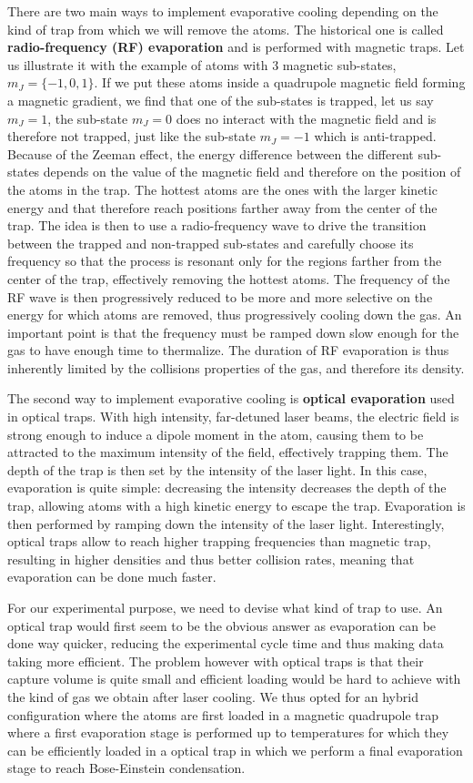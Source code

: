 There are two main ways to implement evaporative cooling depending on the kind of trap from which we will remove the atoms. The historical one is called \textbf{radio-frequency (RF) evaporation} and is performed with magnetic traps. Let us illustrate it with the example of atoms with 3 magnetic sub-states, $m_J=\{-1,0,1\}$. If we put these atoms inside a quadrupole magnetic field forming a magnetic gradient, we find that one of the sub-states is trapped, let us say $m_J=1$, the sub-state $m_J=0$ does no interact with the magnetic field and is therefore not trapped, just like the sub-state $m_J=-1$ which is anti-trapped. Because of the Zeeman effect, the energy difference between the different sub-states depends on the value of the magnetic field and therefore on the position of the atoms in the trap. The hottest atoms are the ones with the larger kinetic energy and that therefore reach positions farther away from the center of the trap. The idea is then to use a radio-frequency wave to drive the transition between the trapped and non-trapped sub-states and carefully choose its frequency so that the process is resonant only for the regions farther from the center of the trap, effectively removing the hottest atoms. The frequency of the RF wave is then progressively reduced to be more and more selective on the energy for which atoms are removed, thus progressively cooling down the gas. An important point is that the frequency must be ramped down slow enough for the gas to have enough time to thermalize. The duration of RF evaporation is thus inherently limited by the collisions properties of the gas, and therefore its density.

The second way to implement evaporative cooling is \textbf{optical evaporation} used in optical traps. With high intensity, far-detuned laser beams, the electric field is strong enough to induce a dipole moment in the atom, causing them to be attracted to the maximum intensity of the field, effectively trapping them. The depth of the trap is then set by the intensity of the laser light. In this case, evaporation is quite simple: decreasing the intensity decreases the depth of the trap, allowing atoms with a high kinetic energy to escape the trap. Evaporation is then performed by ramping down the intensity of the laser light. Interestingly, optical traps allow to reach higher trapping frequencies than magnetic trap, resulting in higher densities and thus better collision rates, meaning that evaporation can be done much faster.

For our experimental purpose, we need to devise what kind of trap to use. An optical trap would first seem to be the obvious answer as evaporation can be done way quicker, reducing the experimental cycle time and thus making data taking more efficient. The problem however with optical traps is that their capture volume is quite small and efficient loading would be hard to achieve with the kind of gas we obtain after laser cooling. We thus opted for an hybrid configuration where the atoms are first loaded in a magnetic quadrupole trap where a first evaporation stage is performed up to temperatures for which they can be efficiently loaded in a optical trap in which we perform a final evaporation stage to reach Bose-Einstein condensation.

